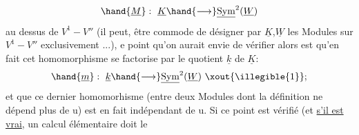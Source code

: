 \[ \hand{\underline{M}} : \ \underline{K}\hand{\longrightarrow}\underline{\mathrm{Sym}}^2(\underline{W}) \]
au dessus de $V^1-V''$ (il peut, être commode de désigner par $\underline{K}$,$\underline{W}$ les Modules
sur $V^1-V''$ exclusivement ...),  e point qu'on aurait envie de vérifier
alors est qu'en fait cet homomorphisme se factorise par le quotient $\underline{k}$ de $\underline{K}$:
\[ \hand{\underline{m}} : \ \underline{k}\hand{\longrightarrow}\underline{\mathrm{Sym}}^2(\underline{W}) \ \xout{\illegible{1}} ; \]
et que ce dernier homomorhisme (entre deux Modules dont la définition ne
 dépend plus de u) est en fait indépendant de
u. Si ce point est vérifié (et \uline{s'il est vrai}, un calcul élémentaire doit le

